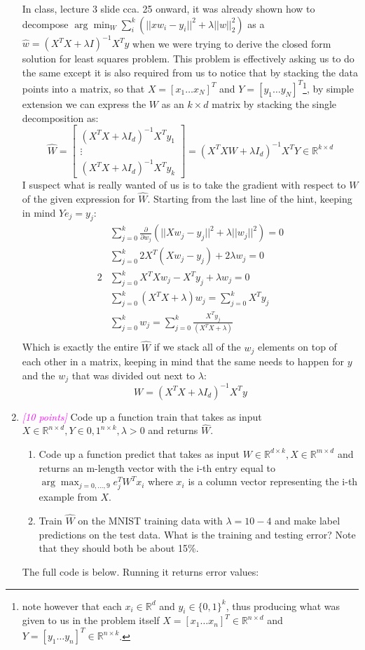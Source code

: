 \documentclass{article}
\newcommand{\argmax}{\arg\!\max}
\newcommand{\argmin}{\arg\!\min}
\newcommand{\field}[1]{\mathbb{#1}}
\newcommand{\1}{\mathbf{1}}
\newcommand{\R}{\field{R}} %
\newcommand{\points}[1]{\small\textcolor{magenta}{\emph{[#1 points]}} \normalsize}
\begin{document}
\begin{enumerate}
    In class, lecture 3 slide cca. 25 onward, it was already shown how to decompose $\argmin_W\sum_i^k (||xw_i-y_i||^2+\lambda ||w||^2_2)$ as a $\hat w = (X^TX+\lambda I)^{-1}X^Ty$ when we were trying to derive the closed form solution for least squares problem. This problem is effectively asking us to do the same except it is also required from us to notice that by stacking the data points into a matrix, so that $X=[x_1 \hdots x_N]^T$ and $Y=[y_1 \hdots y_N]^T$\footnote{note however that each $x_i \in \R^d$ and $y_i\in \{0,1\}^k$, thus producing what was given to us in the problem itself $X=[x_1\hdots x_n]^T\in\R^{n\times d}$ and $Y=[y_1\hdots y_n]^T\in\R^{n\times k}$.}, by simple extension we can express the $W$ as an $k\times d$ matrix by stacking the single decomposition as:
    $$ \widehat W = 
    \begin{bmatrix} 
        (X^TX+\lambda I_d)^{-1}X^Ty_1 \\ 
        \vdots \\ 
        (X^TX+\lambda I_d)^{-1}X^Ty_k
    \end{bmatrix} 
    = (X^TXW+\lambda I_d)^{-1}X^TY \in \R^{k\times d}
    $$
    I suspect what is really wanted of us is to take the gradient with respect to $W$ of the given expression for $\widehat W$. Starting from the last line of the hint, keeping in mind $Ye_j=y_j$: 
    \begin{align*}
        &\sum_{j=0}^k \frac{\partial}{\partial w_j} \left(||Xw_j - y_j||^2 + \lambda ||w_j||^2\right) = 0 \\
        &\sum_{j=0}^k 2X^T(Xw_j - y_j) + 2\lambda w_j = 0 \\
        2&\sum_{j=0}^k X^TXw_j - X^Ty_j + \lambda w_j = 0 \\
        &\sum_{j=0}^k (X^TX + \lambda)w_j = \sum_{j=0}^k X^Ty_j \\
        &\sum_{j=0}^k w_j = \sum_{j=0}^k \frac{X^Ty_j}{(X^TX + \lambda)} \\
    \end{align*}{}
    Which is exactly the entire $\widehat W$ if we stack all of the $w_j$ elements on top of each other in a matrix, keeping in mind that the same needs to happen for $y$ and the $w_j$ that was divided out next to $\lambda$:
    $$W = (X^TX+\lambda I_d)^{-1}X^Ty$$
    
    \newpage
    \item \points{10} Code up a function train that takes as input $X\in\R^{n\times d},Y\in {0,1}^{n\times k},\lambda>0$ and returns $\hat W$.
    \begin{enumerate}
        \item Code up a function predict that takes as input $W\in\R^{d\times k},X\in\R^{m\times d}$ and returns an m-length vector with the i-th entry equal to $\argmax_{j=0,...,9}e^T_jW^Tx_i$ where $x_i$ is a column vector representing the i-th example from $X$.
        \item Train $\widehat W$ on the MNIST training data with $\lambda = 10-4$ and make label predictions on the test data. What is the training and testing error? Note that they should both be about 15\%.
    \end{enumerate}
    The full code is below. Running it returns error values:
    

\end{enumerate}
\end{document}
